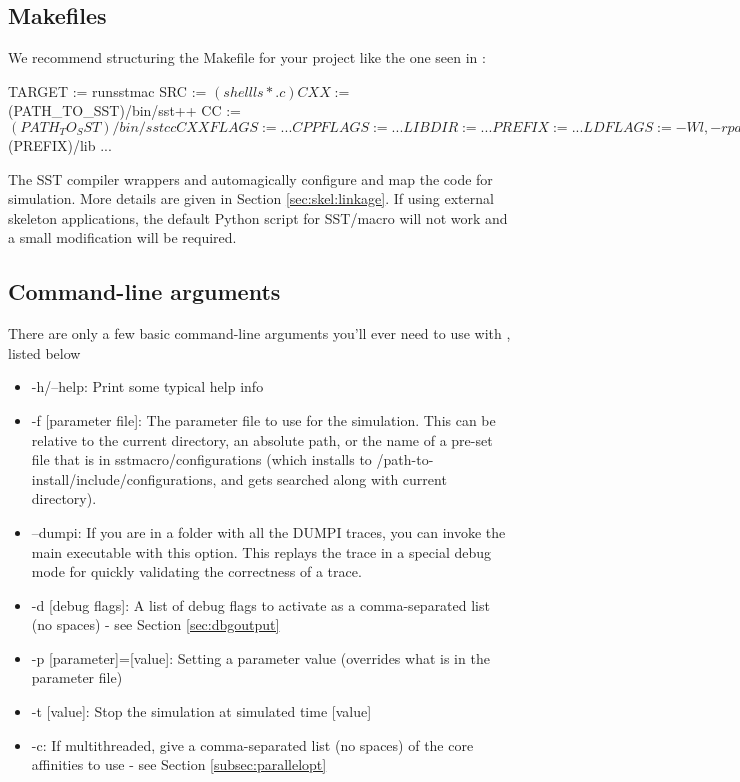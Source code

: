 \subsection{Makefiles}
\label{subsec:tutorial:makefiles}

We recommend structuring the Makefile for your project like the one seen in  :

\begin{ViFile}
TARGET := runsstmac
SRC := $(shell ls *.c) 

CXX :=      $(PATH_TO_SST)/bin/sst++
CC :=        $(PATH_TO_SST)/bin/sstcc
CXXFLAGS := ...
CPPFLAGS := ...
LIBDIR :=  ...
PREFIX :=   ...
LDFLAGS :=  -Wl,-rpath,$(PREFIX)/lib
...
\end{ViFile}
The SST compiler wrappers  and  automagically configure and map the code for simulation.  More details are given in Section \ref{sec:skel:linkage}.  If using external skeleton applications, the default Python script for SST/macro will not work and a small modification will be required.

\subsection{Command-line arguments}
\label{subsec:tutorial:cmdline}

There are only a few basic command-line arguments you'll ever need to use with \sstmacro, listed below

\begin{itemize}
\item -h/--help: Print some typical help info
\item -f [parameter file]: The parameter file to use for the simulation.  
This can be relative to the current directory, an absolute path, or the name of a pre-set file that is in sstmacro/configurations 
(which installs to /path-to-install/include/configurations, and gets searched along with current directory). 
\item --dumpi: If you are in a folder with all the DUMPI traces, you can invoke the main  executable with this option.  This replays the trace in a special debug mode for quickly validating the correctness of a trace.
\item -d [debug flags]: A list of debug flags to activate as a comma-separated list (no spaces) - see Section \ref{sec:dbgoutput}
\item -p [parameter]=[value]: Setting a parameter value (overrides what is in the parameter file)
\item -t [value]: Stop the simulation at simulated time [value]
\item -c: If multithreaded, give a comma-separated list (no spaces) of the core affinities to use - see Section \ref{subsec:parallelopt}
\end{itemize}

